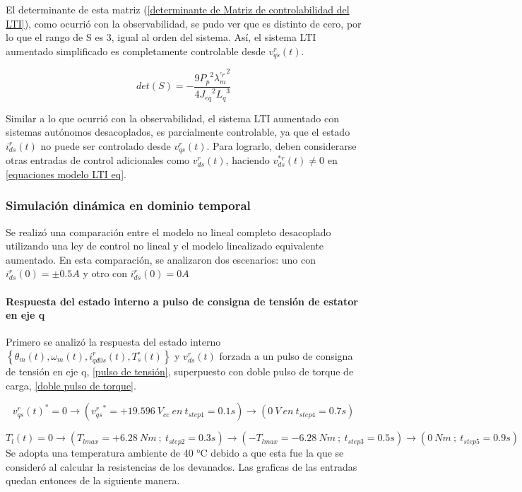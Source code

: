 \documentclass[a4paper, 10pt, onecolumn,journal]{ieeeconf}
\begin{document}
El determinante de esta matriz (\cref{determinante de Matriz de controlabilidad del LTI}), 
como ocurrió con la observabilidad, se pudo ver que es distinto de cero, por lo que el rango de S es 3, igual al orden del sistema. Así, el sistema LTI aumentado simplificado es completamente controlable desde $v^r_{qs}(t)$.

\begin{equation}
	det(S)= -\frac{9 {P_p}^2 {\lambda^{'r}_m}^2}{4 {J_{eq}}^2 {{L_q}}^3}
	\label{determinante de Matriz de controlabilidad del LTI}
\end{equation}

Similar a lo que ocurrió con la observabilidad, el sistema LTI aumentado con sistemas autónomos desacoplados, es parcialmente controlable, ya que el estado ${i}^r_{ds}(t) $  no puede ser controlado desde $v^r_{qs}(t)$. Para lograrlo, deben considerarse otras entradas de control adicionales como  $v^r_{ds}(t)$, haciendo
$v^{*r}_{ds}(t) \neq 0$ en \cref{equaciones modelo LTI eq}.


\subsubsection{\textbf{Simulación dinámica en dominio temporal}} 
Se realizó una comparación entre el modelo no lineal completo desacoplado utilizando una ley de control no lineal y el modelo linealizado equivalente aumentado. En esta comparación, se analizaron dos escenarios: uno con $i^r_{ds}(0) = \pm 0.5 A $  y otro con $i^r_{ds}(0) = 0 A $ 
\paragraph{\textbf{Respuesta del estado interno a pulso de consigna de tensión de estator en eje q}}
Primero se analizó la respuesta del estado interno $\left\lbrace \theta_m(t), \omega_{m}(t), i^r_{qd0s}(t), T^\circ_s(t)\right\rbrace $ y $v^r_{ds}(t)$ forzada a un pulso de consigna de tensión en eje q, \cref{pulso de tensión}, superpuesto con doble pulso de torque de carga, \cref{doble pulso de torque}.

\begin{equation}
	{v^r_{qs}(t)}^* = 0 \rightarrow \left({v^r_{qs}}^* = +19.596 \: V_{cc} \  en \ t_{step1}=0.1s \right) \rightarrow \left(0 \: V \  en \ t_{step4}=0.7s \right)
	\label{pulso de tensión}
\end{equation}

\begin{equation}
	T_{l}(t) = 0 \rightarrow \left(T_{lmax} = +6.28 \: Nm \ ; \ t_{step2}=0.3s \right) \rightarrow \left(-T_{lmax} = -6.28 \: Nm \ ; \ t_{step3}=0.5s \right)
	 \rightarrow \left(0 \: Nm \ ; \ t_{step5}=0.9s \right) 
	 \label{doble pulso de torque}
\end{equation}
Se adopta una temperatura ambiente de 40 °C debido a que esta fue la que se consideró al calcular la resistencias de los devanados. Las graficas de las entradas quedan entonces de la siguiente manera.
\end{document}
